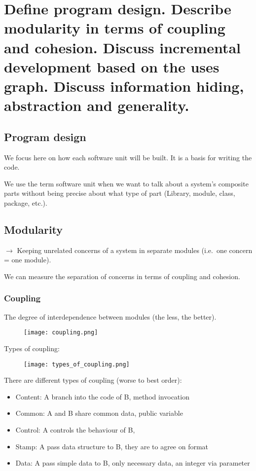 \clearpage{}
\section{Define program design. Describe modularity in terms of coupling
and cohesion. Discuss incremental development based on the uses graph.
Discuss information hiding, abstraction and generality.}

\subsection{Program design}

We focus here on how each software unit will be built. It is a basis for writing the code. \newline

We use the term software unit when we want to talk about a system’s composite parts
without being precise about what type of part (Library, module, class, package, etc.).

\subsection{Modularity}

$\rightarrow$ Keeping unrelated concerns of a system in separate modules (i.e.\ one concern = one
module). \newline

We can measure the separation of concerns in terms of coupling and cohesion. \newline

\subsubsection{Coupling}

The degree of interdependence between modules (the less, the better).

\begin{figure}[!ht]
    \centering
    \texttt{[image: coupling.png]}
\end{figure}
\FloatBarrier{}

Types of coupling:
\begin{figure}[!ht]
    \centering
    \texttt{[image: types\_of\_coupling.png]}
\end{figure}
\FloatBarrier{}

There are different types of coupling (worse to best order):
\begin{itemize}
    \item Content: A branch into the code of B, method invocation
    \item Common: A and B share common data, public variable
    \item Control: A controls the behaviour of B, 
    \item Stamp: A pass data structure to B, they are to agree on format
    \item Data: A pass simple data to B, only necessary data, an integer via parameter
\end{itemize}

